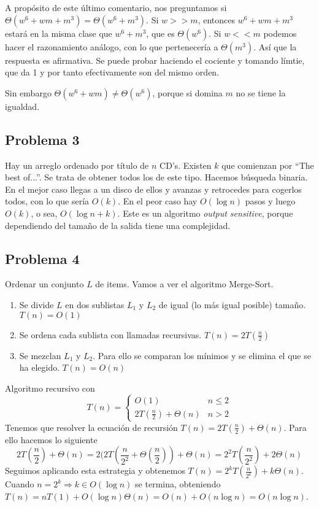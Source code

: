 \documentclass[AL.tex]{subfiles}
\begin{document}
A propósito de este último comentario, nos preguntamos si $\Theta(w^6+wm+m^3)=\Theta(w^6+m^3)$. Si $w>>m$, entonces $w^6+wm+m^3$ estará en la misma clase que $w^6+m^3$, que es $\Theta(w^6)$. Si $w<<m$ podemos hacer el razonamiento análogo, con lo que pertenecería a $\Theta(m^3)$. Así que la respuesta es afirmativa. Se puede probar haciendo el cociente y tomando límtie, que da 1 y por tanto efectivamente son del mismo orden. 

Sin embargo $\Theta(w^6+wm)\neq\Theta(w^6)$, porque si domina $m$ no se tiene la igualdad. 

\subsection{Problema 3}
Hay un arreglo ordenado por título de $n$ CD's. Existen $k$ que comienzan por ``The best of...''. Se trata de obtener todos los de este tipo. Hacemos búsqueda binaria. En el mejor caso llegas a un disco de ellos y avanzas y retrocedes para cogerlos todos, con lo que sería $O(k)$. En el peor caso hay $O(\log n)$ pasos y luego $O(k)$, o sea, $O(\log n +k)$. Este es un algoritmo \emph{output sensitive}, porque dependiendo del tamaño de la salida tiene una complejidad. 


\subsection{Problema 4}
Ordenar un conjunto $L$ de items. Vamos a ver el algoritmo Merge-Sort. 
\begin{enumerate}
\item Se divide $L$ en dos sublistas $L_1$ y $L_2$ de igual (lo más igual posible) tamaño. $T(n)=O(1)$
\item Se ordena cada sublista con llamadas recursivas. $T(n)=2T(\frac{n}{2})$
\item Se mezclan $L_1$ y $L_2$.  Para ello se comparan los mínimos y se elimina el que se ha elegido. $T(n)=O(n)$
\end{enumerate}

Algoritmo recursivo con 
\[
T(n)=\begin{cases}
O(1) & n\leq 2\\
2T(\frac{n}{2})+\Theta(n) & n>2
\end{cases}
\]
Tenemos que resolver la ecuación de recursión $T(n)=2T(\frac{n}{2})+\Theta(n)$. Para ello hacemos lo siguiente
\[
2T\left(\frac{n}{2}\right)+\Theta(n)=2(2T\left(\frac{n}{2^2}+\Theta\left(\frac{n}{2}\right)\right)+\Theta(n)=2^2T\left(\frac{n}{2^2}\right)+2\Theta(n)
\]
Seguimos aplicando esta estrategia y obtenemos $T(n)=2^kT(\frac{n}{2^k})+k\Theta(n)$. Cuando $n=2^k\Rightarrow k\in O(\log n)$ se termina, obteniendo $T(n)=nT(1)+O(\log n)\Theta(n)=O(n)+O(n\log n)=O(n\log n)$. 
\end{document}
